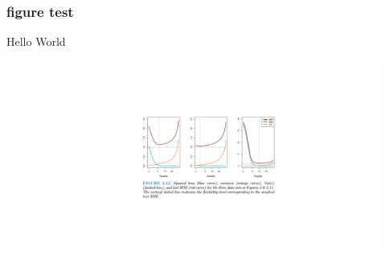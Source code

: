 \documentclass[12]{beamer}
\begin{document}
\begin{frame}
  \frametitle{figure test}
  Hello World
  \begin{figure}[hbt!]
  \includegraphics[width=\linewidth,height=\textheight,keepaspectratio]{Untitled.jpg}
  \end{figure}
\end{frame}
\end{document}

